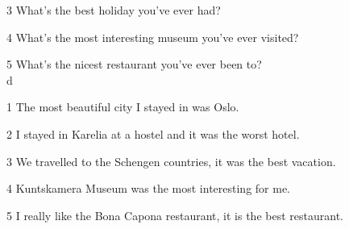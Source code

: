 \documentclass{article}
\begin{document}
3 What's the best holiday you've ever had?

4 What's the most interesting museum you've ever visited?

5 What's the nicest restaurant you've ever been to?
\\
d 

1 The most beautiful city I stayed in was Oslo. 

2 I stayed in Karelia at a hostel and it was the worst hotel. 

3 We travelled to the Schengen countries, it was the best vacation. 

4 Kuntskamera Museum was the most interesting for me.

5 I really like the Bona Capona restaurant, it is the best restaurant.
\end{document}

